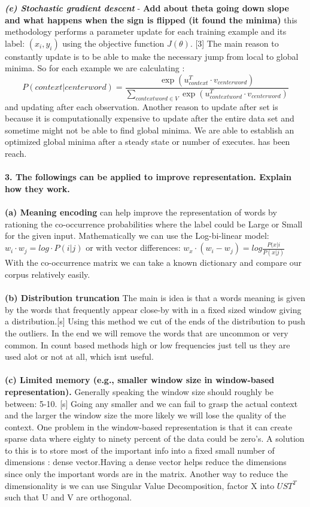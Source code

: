 \documentclass[12pt,a4paper]{report}
\begin{document}
\textbf{\textsl{ (e) Stochastic gradient descent}} - \textbf{Add about theta going down slope and what happens when the sign is flipped (it found the minima)}
this methodology  performs a parameter update for each training example and its label: $(x_{i},y_{i})$ using the objective function $J( \theta)$. [3] The main reason to constantly update is to be able to make the necessary jump from local to global minima. So for each example we are calculating : $$ P( context | center word) = \frac{\exp(u^{T}_{context}\cdot  v_{center word})}
{\sum_{context word \in V} \exp(u^{T}_{context word} \cdot v_{center word})} $$ and updating after each observation. Another reason to update after set is because it is computationally expensive to update after the entire data set and sometime might not be able to find global minima. We are able to establish an optimized global minima after a steady state or number of executes. has been reach.
\\\\
\textbf{3. The followings can be applied to improve representation. Explain how they work.}\\\\
\textbf{(a) Meaning encoding} can help improve the representation of words by rationing the co-occurrence probabilities where the label could be Large or Small for the given input. Mathematically we can use the Log-bi-linear model: $w_{i} \cdot w_{j} = log \cdot P(i | j) $ or with vector differences: $w_{x} \cdot (w_{i} - w_{j} )= log \frac{P(x|i}{P(x|j)} $ With the co-occurrence matrix we can take a known dictionary and compare our corpus relatively easily. 
\\\\
\textbf{(b) Distribution truncation} The main is idea is that a words meaning is given by the words that frequently appear close-by with in a fixed sized window giving a distribution.[s] Using this method we cut of the ends of the distribution to push the outliers. In the end we will remove the words that are uncommon or very common. In count based methods high or low frequencies just tell us they are used alot or not at all, which isnt useful. 
\\\\
\textbf{(c) Limited memory (e.g., smaller window size in window-based representation).}  Generally speaking the window size should roughly be between: 5-10. [s] Going any smaller and we can fail to grasp the actual context and the larger the window size the more likely we will lose the quality of the context. One problem in the window-based representation is that it can create sparse data where eighty to ninety percent of the data could be zero's. A solution to this is to store most of the important info into a fixed small number of dimensions : dense vector.Having a dense vector helps reduce the dimensions since only the important words are in the matrix. Another way to reduce the dimensionality is we can use Singular Value Decomposition, factor X into $UST^{T}$ such that U and V are orthogonal.
\end{document}
